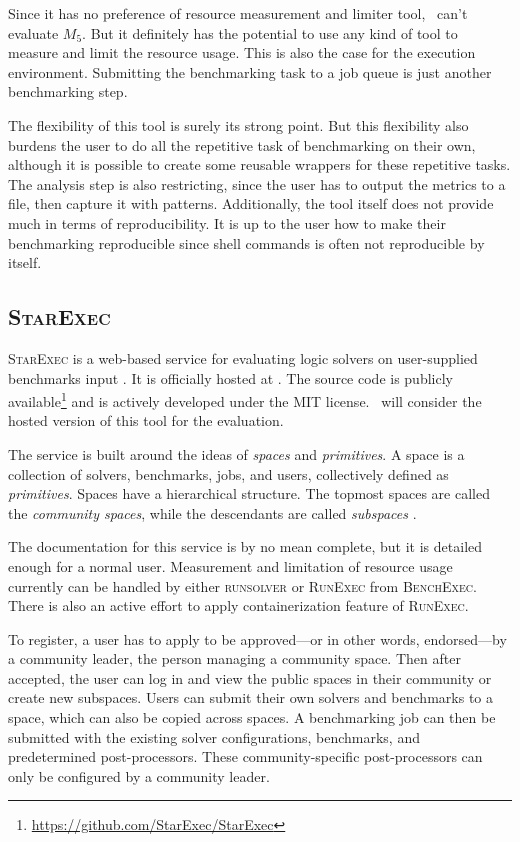 Since it has no preference of resource measurement and limiter tool, \first~can't evaluate $M_5$.
But it definitely has the potential to use any kind of tool to measure and limit the resource usage.
This is also the case for the execution environment.
Submitting the benchmarking task to a job queue is just another benchmarking step.

The flexibility of this tool is surely its strong point.
But this flexibility also burdens the user to do all the repetitive task of benchmarking on their own, although it is possible to create some reusable wrappers for these repetitive tasks.
The analysis step is also restricting, since the user has to output the metrics to a file, then capture it with patterns.
Additionally, the tool itself does not provide much in terms of reproducibility.
It is up to the user how to make their benchmarking reproducible since shell commands is often not reproducible by itself.


\subsection{\textsc{StarExec}}

\textsc{StarExec} is a web-based service for evaluating logic solvers on user-supplied benchmarks input \citep{stumpStarExecCrossCommunityInfrastructure2014}.
It is officially hosted at \href{https://www.starexec.org/}{}.
The source code is publicly available\footnote{\href{https://github.com/StarExec/StarExec}{https://github.com/StarExec/StarExec}} and is actively developed under the MIT license.
\First~will consider the hosted version of this tool for the evaluation.

The service is built around the ideas of \emph{spaces} and \emph{primitives}.
A space is a collection of solvers, benchmarks, jobs, and users, collectively defined as \emph{primitives}.
Spaces have a hierarchical structure.
The topmost spaces are called the \emph{community spaces}, while the descendants are called \emph{subspaces} \citep{stumpStarExecCrossCommunityInfrastructure2014}.

The documentation for this service is by no mean complete, but it is detailed enough for a normal user.
Measurement and limitation of resource usage currently can be handled by either \textsc{runsolver} or \textsc{RunExec} from \textsc{BenchExec}.
There is also an active effort to apply containerization feature of \textsc{RunExec}.

To register, a user has to apply to be approved---or in other words, endorsed---by a community leader, the person managing a community space.
Then after accepted, the user can log in and view the public spaces in their community or create new subspaces.
Users can submit their own solvers and benchmarks to a space, which can also be copied across spaces.
A benchmarking job can then be submitted with the existing solver configurations, benchmarks, and predetermined post-processors.
These community-specific post-processors can only be configured by a community leader.

